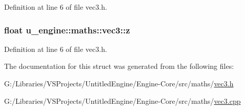 Definition at line 6 of file vec3.\+h.

\hypertarget{structu__engine_1_1maths_1_1vec3_ad154179faa92b8c3e78c2256a41096ee}{}
\subsubsection[{z}]{\setlength{\rightskip}{0pt plus 5cm}float u\+\_\+engine\+::maths\+::vec3\+::z}\label{structu__engine_1_1maths_1_1vec3_ad154179faa92b8c3e78c2256a41096ee}


Definition at line 6 of file vec3.\+h.



The documentation for this struct was generated from the following files\+:\begin{DoxyCompactItemize}
\item 
G\+:/\+Libraries/\+V\+S\+Projects/\+Untitled\+Engine/\+Engine-\/\+Core/src/maths/\hyperlink{vec3_8h}{vec3.\+h}\item 
G\+:/\+Libraries/\+V\+S\+Projects/\+Untitled\+Engine/\+Engine-\/\+Core/src/maths/\hyperlink{vec3_8cpp}{vec3.\+cpp}\end{DoxyCompactItemize}
